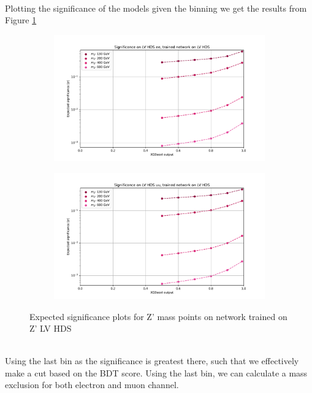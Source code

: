 \documentclass[12pt, a4paper]{book}
\begin{document}
\\Plotting the significance of the models given the binning we get the results from Figure \ref{fig:LV_HDS_exp_sig}
\begin{figure}[!ht]
	\centering
	\begin{subfigure}[b]{0.49\textwidth}
      \centering
      \includegraphics[width=1\textwidth]{XGBoost/LV_HDS/EXP_SIG_ee.pdf}
      \end{subfigure}
   \hfill
   \begin{subfigure}[b]{0.49\textwidth}
      \centering
      \includegraphics[width=1\textwidth]{XGBoost/LV_HDS/EXP_SIG_uu.pdf}
      \end{subfigure}
   \caption{Expected significance plots for Z' mass points on network trained on Z' LV HDS}\label{fig:LV_HDS_exp_sig}
\end{figure}
\\Using the last bin as the significance is greatest there, such that we effectively make a cut based on the BDT score. Using the last bin, we can calculate a mass exclusion for both electron and muon channel.\\
\end{document}
